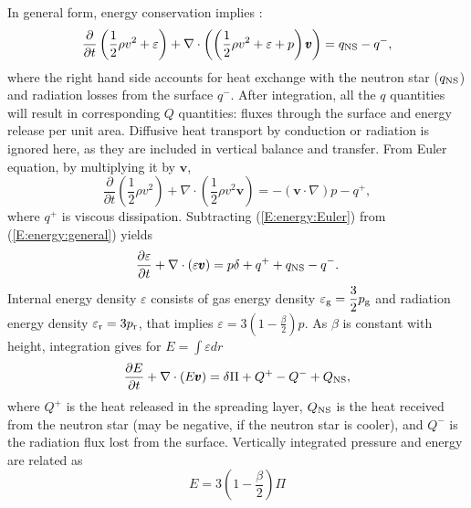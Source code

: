 \documentclass[usenatbib,onecolumn]{mnras}
\renewcommand{\vector}[1]{\ensuremath{\pmb{#1}}}
\newcommand{\pardir}[2]{\ensuremath{\frac{\partial #2}{\partial #1} }}
\newcommand{\ppardir}[2]{\ensuremath{\frac{\partial }{\partial #1} \left( #2\right)}}
\begin{document}
In general form, energy conservation implies \citep{VP06}:
\begin{equation}\label{E:energy:general}
\ppardir{t}{\frac{1}{2}\rho v^2 + \varepsilon}+\nabla \cdot \left(
\left(\frac{1}{2}\rho v^2 + \varepsilon + p \right)
\vector{v}\right) = q_{\rm NS} - q^{-},
\end{equation}
where the right hand side accounts for heat exchange with the neutron star ($q_{\rm NS}$) and radiation losses from the surface
$q^{-}$. After integration, all the $q$ quantities will result in
corresponding $Q$ quantities: fluxes through the surface and energy release
per unit area.
Diffusive heat transport by conduction or radiation is ignored here,
as they are included in vertical balance and transfer.
From Euler equation, by multiplying it by $\vector{v}$,
\begin{equation}\label{E:energy:Euler}
  \ppardir{t}{\frac{1}{2}\rho v^2}+\nabla \cdot \left(\frac{1}{2}\rho v^2
  \vector{v}\right) = -(\vector{v} \cdot \nabla) p - q^+,
\end{equation}
where $q^+$ is viscous dissipation. Subtracting (\ref{E:energy:Euler}) from
(\ref{E:energy:general}) yields
\begin{equation}\label{E:energy:thermal}
\pardir{t}{\varepsilon} + \nabla \cdot \left( \varepsilon \vector{v}\right) =
p \delta + q^+ + q_{\rm NS} - q^-.
\end{equation}
Internal energy density $\varepsilon$ consists of gas energy density
$\displaystyle \varepsilon_{\rm g} = \frac{3}{2} p_{\rm g}$ and radiation energy density
$\varepsilon_{\rm r} = 3 p_{\rm r}$, that implies $\displaystyle \varepsilon = 3\left(
1-\frac{\beta}{2}\right) p$. As $\beta$ is constant with height, integration
gives for $E=\int \varepsilon dr$
\begin{equation}\label{E:energy:Eint}
\displaystyle \pardir{t}{E} + \nabla \cdot \left( E \vector{v}\right) =\delta \Pi + Q^+ - Q^- + Q_{\rm NS},
\end{equation}
where $Q^+$ is the heat released in the spreading layer, $Q_{\rm NS}$ is the
heat received from the neutron star (may be negative, if the neutron star is
cooler), and $Q^-$ is the radiation flux lost from the surface. Vertically
integrated pressure and energy are related as
\begin{equation}\label{E:energy:PE}
\displaystyle E = 3\left(1-\frac{\beta}{2}\right) \Pi
\end{equation}
\end{document}

